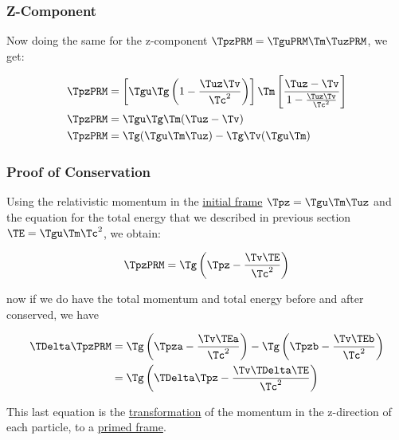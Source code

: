 \begin{derivation}
\subsubsection{Z-Component}

Now doing the same for the z-component $\TpzPRM  = \TguPRM  \Tm  \TuzPRM $, we get:

\begin{equation}
\begin{aligned}
	\TpzPRM  & = \left[ \Tgu  \Tg  \left(1 - \frac{\Tuz  \Tv }{\Tc ^2}\right) \right] \Tm  \left[ \frac{\Tuz  - \Tv }{1 - \frac{\Tuz  \Tv }{\Tc ^2} } \right] \\
	\TpzPRM  & = \Tgu  \Tg  \Tm  (\Tuz  - \Tv )                                                                                              \\
	\TpzPRM  & = \Tg  (\Tgu  \Tm  \Tuz ) - \Tg  \Tv  (\Tgu  \Tm )
\end{aligned}
\end{equation}

\subsubsection{Proof of Conservation}

Using the relativistic momentum in the \hyperlink{def-initial-Frame}{initial frame} $\Tpz  = \Tgu  \Tm  \Tuz $ and the equation for the total energy that we described in previous section $\TE  = \Tgu  \Tm  \Tc ^2$, we obtain:

\begin{equation}
	\TpzPRM  = \Tg  \left( \Tpz  - \frac{\Tv  \TE }{\Tc ^2} \right)
\end{equation}

now if we do have the total momentum and total energy before and after conserved, we have

\begin{equation}
	\begin{aligned}
		\TDelta  \TpzPRM  &= \Tg  \left( \Tpza  - \frac{\Tv  \TEa }{\Tc ^2} \right) - \Tg  \left( \Tpzb  - \frac{\Tv  \TEb }{\Tc ^2} \right) \\
		&= \Tg  \left( \TDelta  \Tpz  - \frac{\Tv  \TDelta  \TE }{\Tc ^2} \right)
	\end{aligned}
\end{equation}

This last equation is the \hyperlink{def-transform}{transformation} of the momentum in the z-direction of each particle, to a \hyperlink{def-Primed-Frame}{primed frame}.


\end{derivation}
